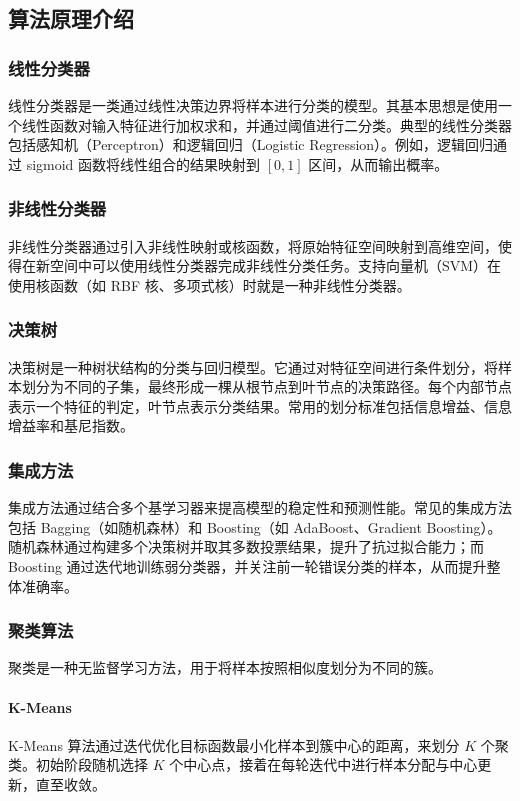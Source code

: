 \documentclass{SYSUReport}
\begin{document}
\subsection{算法原理介绍}
\subsubsection{线性分类器}
线性分类器是一类通过线性决策边界将样本进行分类的模型。其基本思想是使用一个线性函数对输入特征进行加权求和，并通过阈值进行二分类。典型的线性分类器包括感知机（Perceptron）和逻辑回归（Logistic Regression）。例如，逻辑回归通过 sigmoid 函数将线性组合的结果映射到 $[0,1]$ 区间，从而输出概率。

\subsubsection{非线性分类器}
非线性分类器通过引入非线性映射或核函数，将原始特征空间映射到高维空间，使得在新空间中可以使用线性分类器完成非线性分类任务。支持向量机（SVM）在使用核函数（如 RBF 核、多项式核）时就是一种非线性分类器。

\subsubsection{决策树}
决策树是一种树状结构的分类与回归模型。它通过对特征空间进行条件划分，将样本划分为不同的子集，最终形成一棵从根节点到叶节点的决策路径。每个内部节点表示一个特征的判定，叶节点表示分类结果。常用的划分标准包括信息增益、信息增益率和基尼指数。

\subsubsection{集成方法}
集成方法通过结合多个基学习器来提高模型的稳定性和预测性能。常见的集成方法包括 Bagging（如随机森林）和 Boosting（如 AdaBoost、Gradient Boosting）。随机森林通过构建多个决策树并取其多数投票结果，提升了抗过拟合能力；而 Boosting 通过迭代地训练弱分类器，并关注前一轮错误分类的样本，从而提升整体准确率。

\subsubsection{聚类算法}
聚类是一种无监督学习方法，用于将样本按照相似度划分为不同的簇。

\paragraph{K-Means}
K-Means 算法通过迭代优化目标函数最小化样本到簇中心的距离，来划分 $K$ 个聚类。初始阶段随机选择 $K$ 个中心点，接着在每轮迭代中进行样本分配与中心更新，直至收敛。
\end{document}
